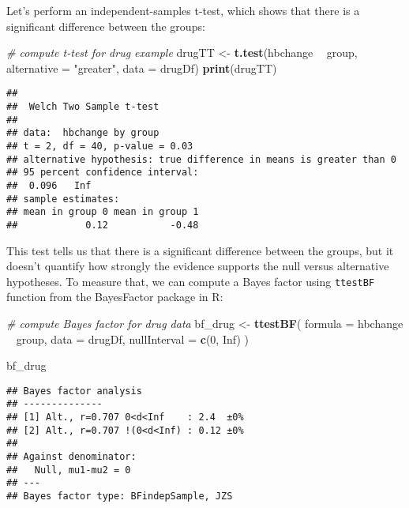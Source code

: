 \documentclass[]{book}
\newenvironment{Shaded}{\begin{snugshade}}{\end{snugshade}}
\newcommand{\KeywordTok}[1]{\textcolor[rgb]{0.13,0.29,0.53}{\textbf{#1}}}
\newcommand{\DataTypeTok}[1]{\textcolor[rgb]{0.13,0.29,0.53}{#1}}
\newcommand{\DecValTok}[1]{\textcolor[rgb]{0.00,0.00,0.81}{#1}}
\newcommand{\StringTok}[1]{\textcolor[rgb]{0.31,0.60,0.02}{#1}}
\newcommand{\CommentTok}[1]{\textcolor[rgb]{0.56,0.35,0.01}{\textit{#1}}}
\newcommand{\OtherTok}[1]{\textcolor[rgb]{0.56,0.35,0.01}{#1}}
\newcommand{\OperatorTok}[1]{\textcolor[rgb]{0.81,0.36,0.00}{\textbf{#1}}}
\newcommand{\NormalTok}[1]{#1}
\theoremstyle{definition}
\theoremstyle{definition}
\theoremstyle{definition}
\theoremstyle{remark}
\begin{document}
Let's perform an independent-samples t-test, which shows that there is a
significant difference between the groups:

\begin{Shaded}
\begin{Highlighting}[]
\CommentTok{# compute t-test for drug example}
\NormalTok{drugTT <-}\StringTok{ }\KeywordTok{t.test}\NormalTok{(hbchange }\OperatorTok{~}\StringTok{ }\NormalTok{group, }\DataTypeTok{alternative =} \StringTok{"greater"}\NormalTok{, }\DataTypeTok{data =}\NormalTok{ drugDf)}
\KeywordTok{print}\NormalTok{(drugTT)}
\end{Highlighting}
\end{Shaded}

\begin{verbatim}
## 
##  Welch Two Sample t-test
## 
## data:  hbchange by group
## t = 2, df = 40, p-value = 0.03
## alternative hypothesis: true difference in means is greater than 0
## 95 percent confidence interval:
##  0.096   Inf
## sample estimates:
## mean in group 0 mean in group 1 
##            0.12           -0.48
\end{verbatim}

This test tells us that there is a significant difference between the
groups, but it doesn't quantify how strongly the evidence supports the
null versus alternative hypotheses. To measure that, we can compute a
Bayes factor using \texttt{ttestBF} function from the BayesFactor
package in R:

\begin{Shaded}
\begin{Highlighting}[]
\CommentTok{# compute Bayes factor for drug data}
\NormalTok{bf_drug <-}\StringTok{ }\KeywordTok{ttestBF}\NormalTok{(}
  \DataTypeTok{formula =}\NormalTok{ hbchange }\OperatorTok{~}\StringTok{ }\NormalTok{group, }\DataTypeTok{data =}\NormalTok{ drugDf,}
  \DataTypeTok{nullInterval =} \KeywordTok{c}\NormalTok{(}\DecValTok{0}\NormalTok{, }\OtherTok{Inf}\NormalTok{)}
\NormalTok{)}

\NormalTok{bf_drug}
\end{Highlighting}
\end{Shaded}

\begin{verbatim}
## Bayes factor analysis
## --------------
## [1] Alt., r=0.707 0<d<Inf    : 2.4  ±0%
## [2] Alt., r=0.707 !(0<d<Inf) : 0.12 ±0%
## 
## Against denominator:
##   Null, mu1-mu2 = 0 
## ---
## Bayes factor type: BFindepSample, JZS
\end{verbatim}
\end{document}
